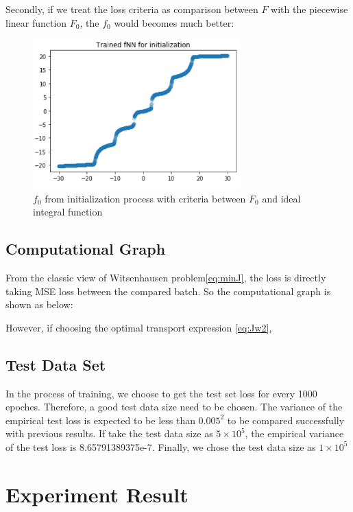 \documentclass[conference,compsoc]{IEEEtran}
\begin{document}
Secondly, if we treat the loss criteria as comparison between $F$ with the piecewise linear function $F_0$, the $f_0$ would becomes much better:
\begin{figure}[htp]
  \centering
  \includegraphics[width=8cm]{images/ICNN_f_init.png}
  \caption{$f_0$ from initialization process with criteria between $F_0$ and ideal integral function}
  \label{fig:train result}
\end{figure}

\subsection{Computational Graph}
From the classic view of Witsenhausen problem\eqref{eq:minJ}, the loss is directly taking MSE loss between the compared batch. So the computational graph is shown as below:


However, if choosing the optimal transport expression \eqref{eq:Jw2}, 

\subsection{Test Data Set}
In the process of training, we choose to get the test set loss for every 1000 epoches. Therefore, a good test data size need to be chosen. The variance of the empirical test loss is expected to be less than $0.005^2$ to be compared successfully with previous results. If take the test data size as $5\times10^5$, the empirical variance of the test loss is 8.65791389375e-7. Finally, we chose the test data size as $1\times10^5$

\section{Experiment Result}
\end{document}
